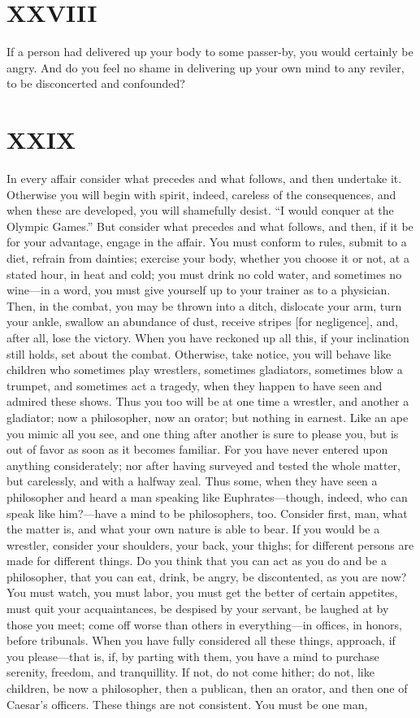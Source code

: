 \documentclass[11pt]{article}
\begin{document}
\section*{XXVIII}

If a person had delivered up your body to some passer-by, you would certainly be angry. And do you feel no shame in delivering up your own mind to any reviler, to be disconcerted and confounded?
\section*{XXIX}

In every affair consider what precedes and what follows, and then undertake it. Otherwise you will begin with spirit, indeed, careless of the consequences, and when these are developed, you will shamefully desist. “I would conquer at the Olympic Games.” But consider what precedes and what follows, and then, if it be for your advantage, engage in the affair. You must conform to rules, submit to a diet, refrain from dainties; exercise your body, whether you choose it or not, at a stated hour, in heat and cold; you must drink no cold water, and sometimes no wine—in a word, you must give yourself up to your trainer as to a physician. Then, in the combat, you may be thrown into a ditch, dislocate your arm, turn your ankle, swallow an abundance of dust, receive stripes [for negligence], and, after all, lose the victory. When you have reckoned up all this, if your inclination still holds, set about the combat. Otherwise, take notice, you will behave like children who sometimes play wrestlers, sometimes gladiators, sometimes blow a trumpet, and sometimes act a tragedy, when they happen to have seen and admired these shows. Thus you too will be at one time a wrestler, and another a gladiator; now a philosopher, now an orator; but nothing in earnest. Like an ape you mimic all you see, and one thing after another is sure to please you, but is out of favor as soon as it becomes familiar. For you have never entered upon anything considerately; nor after having surveyed and tested the whole matter, but carelessly, and with a halfway zeal. Thus some, when they have seen a philosopher and heard a man speaking like Euphrates—though, indeed, who can speak like him?—have a mind to be philosophers, too. Consider first, man, what the matter is, and what your own nature is able to bear. If you would be a wrestler, consider your shoulders, your back, your thighs; for different persons are made for different things. Do you think that you can act as you do and be a philosopher, that you can eat, drink, be angry, be discontented, as you are now? You must watch, you must labor, you must get the better of certain appetites, must quit your acquaintances, be despised by your servant, be laughed at by those you meet; come off worse than others in everything—in offices, in honors, before tribunals. When you have fully considered all these things, approach, if you please—that is, if, by parting with them, you have a mind to purchase serenity, freedom, and tranquillity. If not, do not come hither; do not, like children, be now a philosopher, then a publican, then an orator, and then one of Caesar’s officers. These things are not consistent. You must be one man, 
\end{document}
